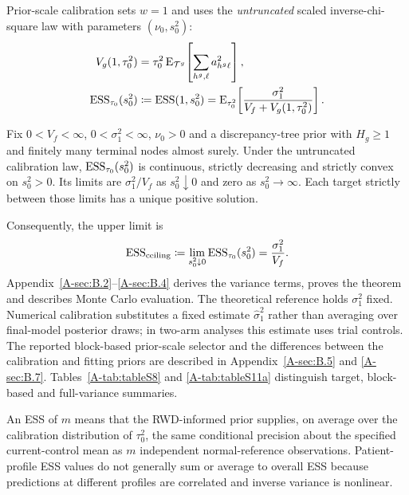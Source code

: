 \documentclass[11pt]{article}
\begin{document}
Prior-scale calibration sets $w=1$ and uses the \emph{untruncated} scaled inverse-chi-square law with parameters $(\nu_0,s_0^2)$:
\begin{equation}\label{eq:essspike}
\begin{aligned}
V_g(1,\tau_0^2)
&=\tau_0^2\operatorname{E}_{\mathcal T^g}\!\left[\sum_{h^g,\ell}a_{h^g\ell}^2\right],\\
\operatorname{ESS}_{\tau_0}(s_0^2)
&\coloneqq\operatorname{ESS}(1,s_0^2)
=\operatorname{E}_{\tau_0^2}\!\left[\frac{\sigma_{1}^2}{V_f+V_g(1,\tau_0^2)}\right].
\end{aligned}
\end{equation}
\begin{theorem}\label{thm:ess}
Fix $0<V_f<\infty$, $0<\sigma_{1}^2<\infty$, $\nu_0>0$ and a discrepancy-tree prior with $H_g\geq1$ and finitely many terminal nodes almost surely. Under the untruncated calibration law, $\operatorname{ESS}_{\tau_0}(s_0^2)$ is continuous, strictly decreasing and strictly convex on $s_0^2>0$. Its limits are $\sigma_{1}^2/V_f$ as $s_0^2\downarrow0$ and zero as $s_0^2\to\infty$. Each target strictly between those limits has a unique positive solution.
\end{theorem}
Consequently, the upper limit is
\begin{equation}\label{eq:ceiling}
\operatorname{ESS}_{\mathrm{ceiling}}\coloneqq \lim_{s_0^2\downarrow0}\operatorname{ESS}_{\tau_0}(s_0^2)=\frac{\sigma_{1}^2}{V_f}.
\end{equation}
Appendix~\ref{A-sec:B.2}--\ref{A-sec:B.4} derives the variance terms, proves the theorem and describes Monte Carlo evaluation. The theoretical reference holds $\sigma_{1}^2$ fixed. Numerical calibration substitutes a fixed estimate $\widehat\sigma_{1}^2$ rather than averaging over final-model posterior draws; in two-arm analyses this estimate uses trial controls. The reported block-based prior-scale selector and the differences between the calibration and fitting priors are described in Appendix~\ref{A-sec:B.5} and \ref{A-sec:B.7}. Tables~\ref{A-tab:tableS8} and \ref{A-tab:tableS11a} distinguish target, block-based and full-variance summaries.

An ESS of $m$ means that the RWD-informed prior supplies, on average over the calibration distribution of $\tau_0^2$, the same conditional precision about the specified current-control mean as $m$ independent normal-reference observations. Patient-profile ESS values do not generally sum or average to overall ESS because predictions at different profiles are correlated and inverse variance is nonlinear.
\end{document}
